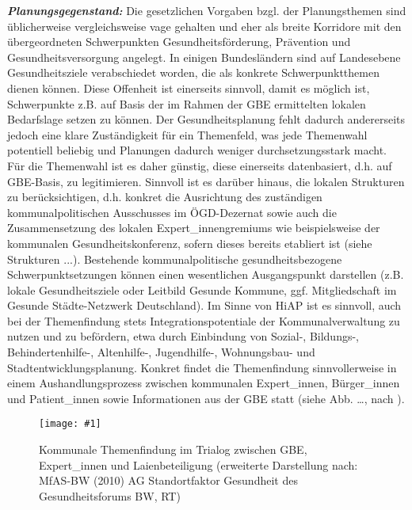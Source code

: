 \documentclass{article}
\newlength{\imgwidth}
\newcommand\scaledgraphics[2]{%
                
\settowidth{\imgwidth}{\texttt{[image: \#1]}}%
                
\setlength{\imgwidth}{\minof{\imgwidth}{#2\textwidth}}%
                
\texttt{[image: \#1]}%
                
}
\begin{document}
\emph{\textbf{Planungsgegenstand: }}Die gesetzlichen Vorgaben bzgl. der Planungsthemen sind üblicherweise vergleichsweise vage gehalten und eher als breite Korridore mit den übergeordneten Schwerpunkten Gesundheitsförderung, Prävention und Gesundheitsversorgung angelegt. In einigen Bundesländern sind auf Landesebene Gesundheitsziele verabschiedet worden, die als konkrete Schwerpunktthemen dienen können. Diese Offenheit ist einerseits sinnvoll, damit es möglich ist, Schwerpunkte z.B. auf Basis der im Rahmen der GBE ermittelten lokalen Bedarfslage setzen zu können. Der Gesundheitsplanung fehlt dadurch andererseits jedoch eine klare Zuständigkeit für ein Themenfeld, was jede Themenwahl potentiell beliebig und Planungen dadurch weniger durchsetzungsstark macht. Für die Themenwahl ist es daher günstig, diese einerseits datenbasiert, d.h. auf GBE-Basis, zu legitimieren. Sinnvoll ist es darüber hinaus, die lokalen Strukturen zu berücksichtigen,  d.h. konkret die Ausrichtung des zuständigen kommunalpolitischen Ausschusses im ÖGD-Dezernat sowie auch die Zusammensetzung des lokalen Expert\_innengremiums wie beispielsweise der kommunalen Gesundheitskonferenz, sofern dieses bereits etabliert ist (siehe Strukturen ...). Bestehende kommunalpolitische gesundheitsbezogene Schwerpunktsetzungen können einen wesentlichen Ausgangspunkt darstellen (z.B. lokale Gesundheitsziele oder Leitbild Gesunde Kommune, ggf. Mitgliedschaft im Gesunde Städte-Netzwerk Deutschland). Im Sinne von HiAP ist es sinnvoll, auch bei der Themenfindung stets Integrationspotentiale der Kommunalverwaltung zu nutzen und zu befördern, etwa durch Einbindung von Sozial-, Bildungs-, Behindertenhilfe-, Altenhilfe-, Jugendhilfe-, Wohnungsbau- und Stadtentwicklungsplanung\autocite{LutheE.-W.2010}. Konkret findet die Themenfindung sinnvollerweise in einem Aushandlungsprozess zwischen kommunalen Expert\_innen, Bürger\_innen und Patient\_innen sowie Informationen aus der GBE statt (siehe Abb. …, nach \autocite{RollerG.undweitere2010}).


\begin{center}
\begin{figure}
\scaledgraphics{d775a334-b272-49b5-b9b3-1338b0755261.png}{0.75}
\caption*{Kommunale Themenfindung im Trialog zwischen GBE, Expert\_innen und Laienbeteiligung (erweiterte Darstellung nach: MfAS-BW (2010) AG Standortfaktor Gesundheit des Gesundheitsforums BW, RT)}\label{F57296601}
\end{figure}


\end{center}
\end{document}
